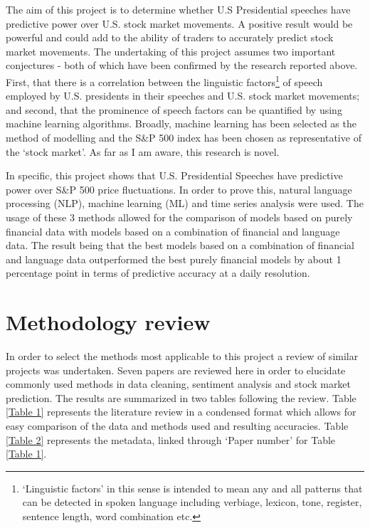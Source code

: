 \documentclass[11pt,preprint, authoryear]{elsarticle}
\numberwithin{equation}{section}
\numberwithin{figure}{section}
\numberwithin{table}{section}
\let\rmarkdownfootnote\footnote%
\def\footnote{\protect\rmarkdownfootnote}
\begin{document}
The aim of this project is to determine whether U.S Presidential
speeches have predictive power over U.S. stock market movements. A
positive result would be powerful and could add to the ability of
traders to accurately predict stock market movements. The undertaking of
this project assumes two important conjectures - both of which have been
confirmed by the research reported above. First, that there is a
correlation between the linguistic factors\footnote{`Linguistic factors'
  in this sense is intended to mean any and all patterns that can be
  detected in spoken language including verbiage, lexicon, tone,
  register, sentence length, word combination etc.} of speech employed
by U.S. presidents in their speeches and U.S. stock market movements;
and second, that the prominence of speech factors can be quantified by
using machine learning algorithms. Broadly, machine learning has been
selected as the method of modelling and the S\&P 500 index has been
chosen as representative of the `stock market'. As far as I am aware,
this research is novel.

In specific, this project shows that U.S. Presidential Speeches have
predictive power over S\&P 500 price fluctuations. In order to prove
this, natural language processing (NLP), machine learning (ML) and time
series analysis were used. The usage of these 3 methods allowed for the
comparison of models based on purely financial data with models based on
a combination of financial and language data. The result being that the
best models based on a combination of financial and language data
outperformed the best purely financial models by about 1 percentage
point in terms of predictive accuracy at a daily resolution.

\hypertarget{methodology-review}{%
\section{Methodology review}\label{methodology-review}}

In order to select the methods most applicable to this project a review
of similar projects was undertaken. Seven papers are reviewed here in
order to elucidate commonly used methods in data cleaning, sentiment
analysis and stock market prediction. The results are summarized in two
tables following the review. Table \ref{Table 1} represents the
literature review in a condensed format which allows for easy comparison
of the data and methods used and resulting accuracies. Table
\ref{Table 2} represents the metadata, linked through `Paper number' for
Table \ref{Table 1}.
\end{document}
